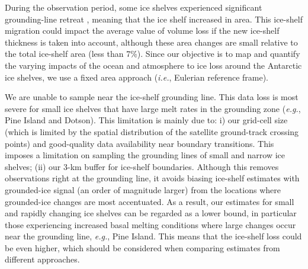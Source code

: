 During the observation period, some ice shelves experienced significant
grounding-line retreat \parencite{Rignot2014}, meaning that the ice shelf
increased in area. This ice-shelf migration could impact the average value of
volume loss if the new ice-shelf thickness is taken into account, although
these area changes are small relative to the total ice-shelf area (less than
7\%). Since our objective is to map and quantify the varying impacts of the
ocean and atmosphere to ice loss around the Antarctic ice shelves, we use a
fixed area approach ({\it i.e.}, Eulerian reference frame).

We are unable to sample near the ice-shelf grounding line. This data loss is
most severe for small ice shelves that have large melt rates in the grounding
zone ({\it e.g.}, Pine Island and Dotson). This limitation is mainly due to: i) our
grid-cell size (which is limited by the spatial distribution of the satellite
ground-track crossing points) and good-quality data availability near boundary
transitions. This imposes a limitation on sampling the grounding lines of small
and narrow ice shelves; (ii) our 3-km buffer for ice-shelf boundaries. Although
this removes observations right at the grounding line, it avoids biasing
ice-shelf estimates with grounded-ice signal (an order of magnitude larger)
from the locations where grounded-ice changes are most accentuated. As a
result, our estimates for small and rapidly changing ice shelves can be
regarded as a lower bound, in particular those experiencing increased basal
melting conditions where large changes occur near the grounding line, {\it e.g.},
Pine Island. This means that the ice-shelf loss could be even higher, which
should be considered when comparing estimates from different approaches.
